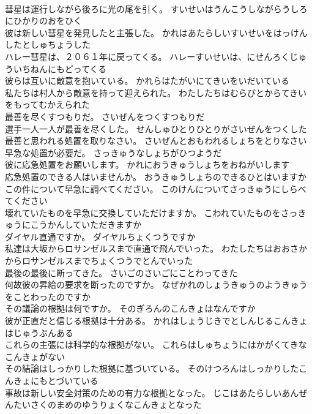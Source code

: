 \documentclass[8pt]{extreport}
\begin{document}
\begin{CJK}{UTF8}{min}
\\	彗星は運行しながら後ろに光の尾を引く。	すいせいはうんこうしながらうしろにひかりのおをひく 
\\	彼は新しい彗星を発見したと主張した。	かれはあたらしいすいせいをはっけんしたとしゅちょうした 
\\	ハレー彗星は、２０６１年に戻ってくる。	ハレーすいせいは、にせんろくじゅういちねんにもどってくる 
\\	彼らは互いに敵意を抱いている。	かれらはたがいにてきいをいだいている 
\\	私たちは村人から敵意を持って迎えられた。	わたしたちはむらびとからてきいをもってむかえられた 
\\	最善を尽くすつもりだ。	さいぜんをつくすつもりだ 
\\	選手一人一人が最善を尽くした。	せんしゅひとりひとりがさいぜんをつくした 
\\	最善と思われる処置を取りなさい。	さいぜんとおもわれるしょちをとりなさい 
\\	早急な処置が必要だ。	さっきゅうなしょちがひつようだ 
\\	彼に応急処置をお願いします。	かれにおうきゅうしょちをおねがいします 
\\	応急処置のできる人はいませんか。	おうきゅうしょちのできるひとはいますか 
\\	この件について早急に調べてください。	このけんについてさっきゅうにしらべてください 
\\	壊れていたものを早急に交換していただけますか。	こわれていたものをさっきゅうにこうかんしていただきますか 
\\	ダイヤル直通ですか。	ダイヤルちょくつうですか 
\\	私達は大坂からロサンゼルスまで直通で飛んでいった。	わたしたちはおおさかからロサンゼルスまでちょくつうでとんでいった 
\\	最後の最後に断ってきた。	さいごのさいごにことわってきた 
\\	何故彼の昇給の要求を断ったのですか。	なぜかれのしょうきゅうのようきゅうをことわったのですか 
\\	その議論の根拠は何ですか。	そのぎろんのこんきょはなんですか 
\\	彼が正直だと信じる根拠は十分ある。	かれはしょうじきでとしんじるこんきょはじゅうぶんある 
\\	これらの主張には科学的な根拠がない。	これらはしゅちょうにはかがくてきなこんきょがない 
\\	その結論はしっかりした根拠に基づいている。	そのけつろんはしっかりしたこんきょにもとづいている 
\\	事故は新しい安全対策のための有力な根拠となった。	じこはあたらしいあんぜんたいさくのまめのゆうりょくなこんきょとなった 

\end{CJK}
\end{document}
